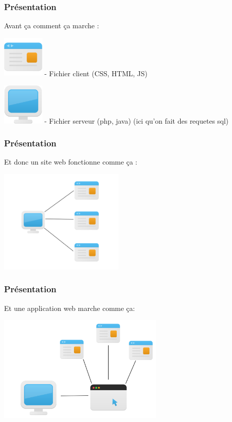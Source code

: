 \documentclass[10pt]{beamer}
\begin{document}
	\begin{frame}
		\frametitle{Présentation}

		Avant ça comment ça marche :

			\includegraphics[width=2cm]{assets/page}\newline
			- Fichier client (CSS, HTML, JS)

			\includegraphics[width=2cm]{assets/server}\newline
			- Fichier serveur (php, java) (ici qu'on fait des requetes sql)

	\end{frame}

	\begin{frame}
		\frametitle{Présentation}

		Et donc un site web fonctionne comme ça :
		\newline \newline

		\centering
		\includegraphics[width=6cm]{assets/siteweb}\newline

	\end{frame}

	\begin{frame}
		\frametitle{Présentation}

		Et une application web marche comme ça:
		\newline \newline

		\centering
		\includegraphics[width=8cm]{assets/appweb}\newline

	\end{frame}
\end{document}
